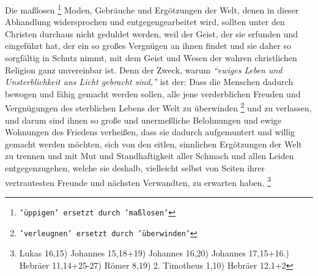 Die maßlosen
\footnote{\texttt{'üppigen' ersetzt durch 'maßlosen'}}
Moden, Gebräuche und Ergötzungen der Welt, denen in dieser
Abhandlung widersprochen und entgegengearbeitet wird, sollten unter den Christen
durchaus nicht geduldet werden, weil der Geist, der sie erfunden und eingeführt
hat, der ein so großes Vergnügen an ihnen findet und sie daher so sorgfältig in
Schutz nimmt, mit dem Geist und Wesen der wahren christlichen Religion ganz
unvereinbar ist. Denn der Zweck, warum
\textit{"`ewiges Leben und Unsterblichkeit ans
Licht gebracht sind,"'} ist der: Dass die Menschen dadurch bewogen und fähig
gemacht werden sollen, alle jene verderblichen Freuden und Vergnügungen des
sterblichen Lebens der Welt zu überwinden
\footnote{\texttt{'verleugnen' ersetzt durch 'überwinden'}}
und zu verlassen, und darum sind ihnen
so große und unermeßliche Belohnungen und ewige
Wohnungen des Friedens
verheißen, dass sie dadurch aufgemuntert und willig gemacht werden möchten, sich
von den eitlen, sinnlichen Ergötzungen der Welt zu trennen und mit Mut und
Standhaftigkeit aller Schmach und allen Leiden entgegenzugehen, welche sie
deshalb, vielleicht selbst von Seiten ihrer vertrautesten Freunde und nächsten
Verwandten, zu erwarten haben.
\footnote{
Lukas 16,15)
Johannes 15,18+19)
Johannes 16,20)
Johannes 17,15+16.)
Hebräer 11,14+25-27)
Römer 8,19)
2. Timotheus 1,10)
Hebräer 12,1+2 }


\medskip

